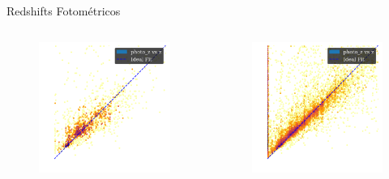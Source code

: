 \begin{frame}[c]{Redshifts Fotométricos}
    \begin{columns}[c]
        \begin{column}{0.32\linewidth}
            \begin{figure}
                \centering
                \includegraphics[width=\linewidth]{images/photo_z_test.png}
            \end{figure}
        \end{column}
        \begin{column}{0.32\linewidth}
            \begin{figure}
                \centering
                \includegraphics[width=\linewidth]{images/photo_z.png}

\end{figure}
\end{column}
\end{columns}
\end{frame}
